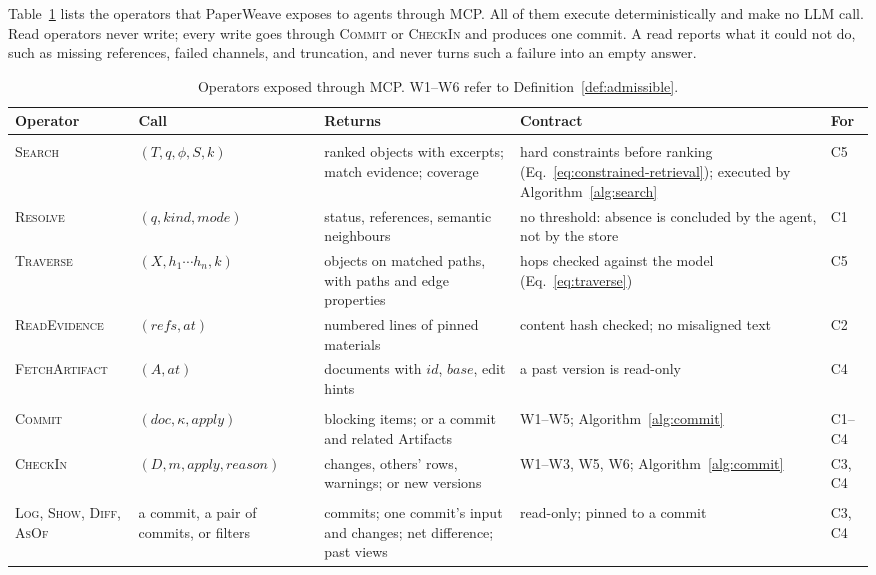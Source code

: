 \documentclass[sigconf,review,anonymous]{acmart}
\begin{document}
Table~\ref{tab:operators} lists the operators that PaperWeave exposes to agents
through MCP. All of them execute deterministically and make no LLM call. Read
operators never write; every write goes through \textsc{Commit} or
\textsc{CheckIn} and produces one commit. A read reports what it could not
do, such as missing references, failed channels, and truncation, and never
turns such a failure into an empty answer.

\begin{table}[tbp]
\caption{Operators exposed through MCP. W1--W6 refer to
Definition~\ref{def:admissible}.}
\label{tab:operators}
\small
\begin{tabular}{@{}>{\raggedright\arraybackslash}p{}
  >{\raggedright\arraybackslash}p{}
  >{\raggedright\arraybackslash}p{}
  >{\raggedright\arraybackslash}p{}
  >{\raggedright\arraybackslash}p{}@{}}
\toprule
Operator & Call & Returns & Contract & For \\
\midrule
\multicolumn{5}{@{}l}{\emph{Read}}\\
\textsc{Search} & $(T, q, \phi, S, k)$ & ranked objects with excerpts; match
evidence; coverage & hard constraints before ranking
(Eq.~\ref{eq:constrained-retrieval}); executed by
Algorithm~\ref{alg:search} & C5 \\
\textsc{Resolve} & $(q, \mathit{kind}, \mathit{mode})$ & status, references,
semantic neighbours & no threshold: absence is concluded by the agent, not by
the store & C1 \\
\textsc{Traverse} & $(X, h_1\cdots h_n, k)$ & objects on matched paths, with
paths and edge properties & hops checked against the model
(Eq.~\ref{eq:traverse}) & C5 \\
\textsc{ReadEvidence} & $(\mathit{refs}, \mathit{at})$ & numbered lines of
pinned materials & content hash checked; no misaligned text & C2 \\
\textsc{FetchArtifact} & $(A, \mathit{at})$ & documents with $\mathit{id}$,
$\mathit{base}$, edit hints & a past version is read-only & C4 \\
\multicolumn{5}{@{}l}{\emph{Write}}\\
\textsc{Commit} & $(\mathit{doc}, \kappa, \mathit{apply})$ & blocking items;
or a commit and related Artifacts & W1--W5; Algorithm~\ref{alg:commit} &
C1--C4 \\
\textsc{CheckIn} & $(D, m, \mathit{apply}, \mathit{reason})$ & changes,
others' rows, warnings; or new versions & W1--W3, W5, W6;
Algorithm~\ref{alg:commit} & C3, C4 \\
\multicolumn{5}{@{}l}{\emph{History}}\\
\textsc{Log}, \textsc{Show}, \textsc{Diff}, \textsc{AsOf} & a commit, a pair
of commits, or filters & commits; one commit's input and changes; net
difference; past views & read-only; pinned to a commit & C3, C4 \\
\bottomrule
\end{tabular}
\end{table}
\end{document}
